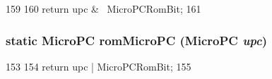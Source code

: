 \begin{DoxyCode}
159 {
160     return upc & ~MicroPCRomBit;
161 }
\end{DoxyCode}
\hypertarget{base_2types_8hh_a5a785ae473dda4e3a3de2cb688f208d9}{
\subsubsection[{romMicroPC}]{\setlength{\rightskip}{0pt plus 5cm}static {\bf MicroPC} romMicroPC ({\bf MicroPC} {\em upc})}}
\label{base_2types_8hh_a5a785ae473dda4e3a3de2cb688f208d9}



\begin{DoxyCode}
153 {
154     return upc | MicroPCRomBit;
155 }
\end{DoxyCode}


